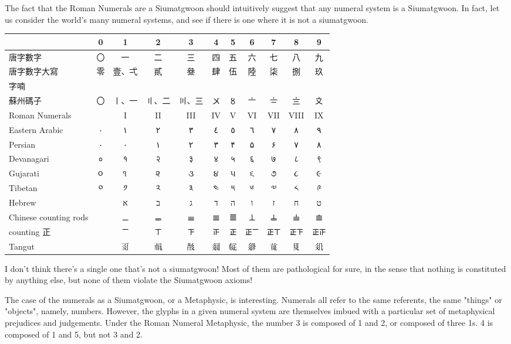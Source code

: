 The fact that the Roman Numerals are a Siumatgwoon should intuitively suggest that any numeral system is a Siumatgwoon. In fact, let us consider the world's many numeral systems, and see if there is one where it is not a siumatgwoon. 

\begin{center}
\begin{tabular}{|l|c|c|c|c|c|c|c|c|c|c|}
\hline
 & 0 & 1 & 2 & 3 & 4 & 5 & 6 & 7 & 8 & 9 \\
\hline
唐字數字 & 〇 & 一 & 二 & 三 & 四 & 五 & 六 & 七 & 八 & 九 \\
\hline
唐字數字大寫 & 零 & 壹、弌 & 貳 & 叄 & 肆 & 伍 & 陸 & 柒 & 捌 & 玖 \\
\hline
字喃 &  & 𠬠 & 𠄩 & 𠀧 & 𦊚 & 𠄼 & 𦒹 & 𦉱 & 𠔭 & 𠃩 \\
\hline
蘇州碼子 & 〇 & 〡、一 & 〢、二 & 〣、三 & 〤 & 〥 & 〦 & 〧 & 〨 & 〩 \\
\hline
Roman Numerals &  & I & II & III & IV & V & VI & VII & VIII & IX \\
\hline
Eastern Arabic & ٠ & ١ & ٢ & ٣ & ٤ & ٥ & ٦ & ٧ & ٨ & ٩ \\
\hline
Persian & ٠ & ۰ & ۱ & ۲ & ۳ & ۴ & ۵ & ۶ & ۷ & ۸ \\
\hline
Devanagari & ० & १ & २ & ३ & ४ & ५ & ६ & ७ & ८ & ९ \\
\hline
Gujarati & ૦ & ૧ & ૨ & ૩ & ૪ & ૫ & ૬ & ૭ & ૮ & ૯ \\
\hline
Tibetan & ༠ & ༡ & ༢ & ༣ & ༤ & ༥ & ༦ & ༧ & ༨ & ༩ \\
\hline
Hebrew &  & א & ב & ג & ד & ה & ו & ז & ח & ט \\
\hline
Chinese counting rods &  & 𝍠 & 𝍡 & 𝍢 & 𝍣 & 𝍤 & 𝍥 & 𝍦 & 𝍧 & 𝍨 \\
\hline
counting 正 &  & 𝍲 & 𝍳 & 𝍴 & 𝍵 & 𝍶 & 𝍶𝍲 & 𝍶𝍳 & 𝍶𝍴 & 𝍶𝍵 \\
\hline
Tangut &  & 𘈩 & 𗍫 & 𘕕 & 𗥃 & 𗏁 & 𗤁 & 𗒹 & 𘉋 & 𗢭 \\
\hline
\end{tabular}
\end{center}

I don't think there's a single one that's not a siumatgwoon! Most of them are pathological for sure, in the sense that nothing is constituted by anything else, but none of them violate the Siumatgwoon axioms! 

The case of the numerals as a Siumatgwoon, or a Metaphysic, is interesting. Numerals all refer to the same referents, the same "things" or "objects", namely, numbers. However, the glyphs in a given numeral system are themselves imbued with a particular set of metaphysical prejudices and judgements. Under the Roman Numeral Metaphysic, the number 3 is composed of 1 and 2, or composed of three 1s. 4 is composed of 1 and 5, but not 3 and 2. 

